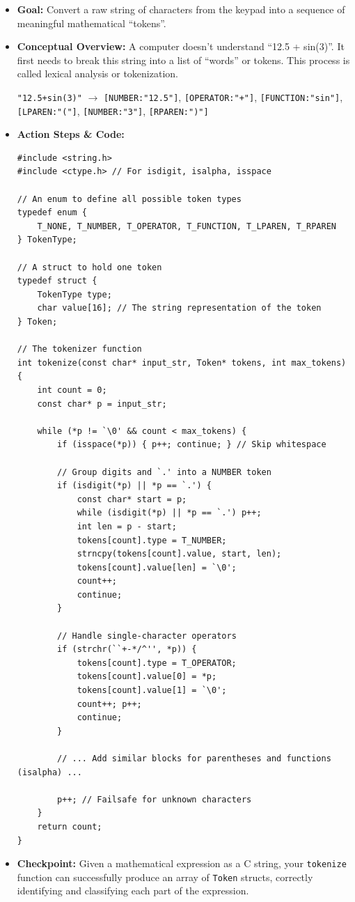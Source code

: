 \documentclass[11pt,a4paper]{article}
\begin{document}
\begin{itemize}
    \item \textbf{Goal:} Convert a raw string of characters from the keypad into a sequence of meaningful mathematical ``tokens''.
    \item \textbf{Conceptual Overview:} A computer doesn't understand ``12.5 + sin(3)''. It first needs to break this string into a list of ``words'' or tokens. This process is called lexical analysis or tokenization.
    \begin{center}
    \verb|"12.5+sin(3)"| $\rightarrow$ \verb|[NUMBER:"12.5"]|, \verb|[OPERATOR:"+"]|, \verb|[FUNCTION:"sin"]|, \verb|[LPAREN:"("]|, \verb|[NUMBER:"3"]|, \verb|[RPAREN:")"]|
    \end{center}
    \item \textbf{Action Steps \& Code:}
\begin{lstlisting}[caption={Code for Module 9.2: A Simple Tokenizer}]
#include <string.h>
#include <ctype.h> // For isdigit, isalpha, isspace

// An enum to define all possible token types
typedef enum {
    T_NONE, T_NUMBER, T_OPERATOR, T_FUNCTION, T_LPAREN, T_RPAREN
} TokenType;

// A struct to hold one token
typedef struct {
    TokenType type;
    char value[16]; // The string representation of the token
} Token;

// The tokenizer function
int tokenize(const char* input_str, Token* tokens, int max_tokens) {
    int count = 0;
    const char* p = input_str;

    while (*p != `\0' && count < max_tokens) {
        if (isspace(*p)) { p++; continue; } // Skip whitespace

        // Group digits and `.' into a NUMBER token
        if (isdigit(*p) || *p == `.') {
            const char* start = p;
            while (isdigit(*p) || *p == `.') p++;
            int len = p - start;
            tokens[count].type = T_NUMBER;
            strncpy(tokens[count].value, start, len);
            tokens[count].value[len] = `\0';
            count++;
            continue;
        }

        // Handle single-character operators
        if (strchr(``+-*/^'', *p)) {
            tokens[count].type = T_OPERATOR;
            tokens[count].value[0] = *p;
            tokens[count].value[1] = `\0';
            count++; p++;
            continue;
        }
        
        // ... Add similar blocks for parentheses and functions (isalpha) ...
        
        p++; // Failsafe for unknown characters
    }
    return count;
}
\end{lstlisting}
    \item \textbf{Checkpoint:} Given a mathematical expression as a C string, your \verb|tokenize| function can successfully produce an array of \verb|Token| structs, correctly identifying and classifying each part of the expression.
\end{itemize}
\newpage
\end{document}
